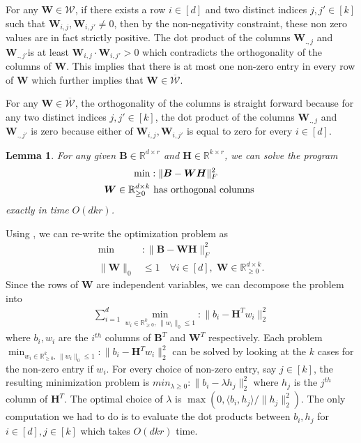 \documentclass[11pt]{article}
\makeatletter
\newcommand{\sumL}{\sum\limits}
\theoremstyle{plain}
\newtheorem{lemma}[theorem]{Lemma}
\theoremstyle{plain}
\theoremstyle{definition}
\theoremstyle{plain}
\theoremstyle{remark}
\newenvironment{proof}[1][\protect\proofname]{\par
	\normalfont\topsep6\p@\@plus6\p@\relax
	\trivlist
	\itemindent\parindent
	\item[\hskip\labelsep\scshape #1]\ignorespaces
}{\endtrivlist\@endpefalse
}
\providecommand{\proofname}{Proof}
\newcommand{\RR}{\mathbb{R}}
\newcommand{\cW}{\mathcal{W}}
\makeatother
\begin{document}
\begin{proof}
    For any $\bm{W}\in \cW$, if there exists a row $i\in [d]$ and two distinct indices $j,j' \in [k]$ such that $\bm{W}_{i,j},\bm{W}_{i,j'}\neq 0$, then by the non-negativity constraint, these non zero values are in fact strictly positive. The dot product of the columns $\bm{W}_{.,j}$ and $\bm{W}_{.,j'}$is at least $\bm{W}_{i,j}\cdot\bm{W}_{i,j'}>0$ which contradicts the orthogonality of the columns of $\bm{W}$. This implies that there is at most one non-zero entry in every row of $\bm{W}$ which further implies that $\bm{W}\in \overline{\cW}$. 

    For any $\bm{W}\in \overline{\cW}$, the orthogonality of the columns is straight forward because for any two distinct indices $j,j'\in [k]$, the dot product of the columns $\bm{W}_{.,j}$ and $\bm{W}_{.,j'}$ is zero because either of $\bm{W}_{i,j}, \bm{W}_{i,j'}$ is equal to zero for every $i\in [d]$.
\end{proof}

\begin{lemma}
\label{lem:NMF-regression}
    For any given $\bm{B}\in \RR^{d\times r}$ and $\bm{H}\in \RR^{k\times r}$, we can solve the program 
    \begin{align*}
        \min&: \|\bm{B}-\bm{W}\bm{H}\|_F^2 \\
   \bm{W}\in \RR^{d\times k}_{\geq 0} & \textnormal{ has orthogonal columns }
    \end{align*}
     exactly in time $O(dkr)$.
\end{lemma}
\begin{proof}
    Using , we can re-write the optimization problem as 
    \begin{align*}
         \min&: \|\bm{B}-\bm{W}\bm{H}\|_F^2 \\
   \|\bm{W}\|_{0} & \leq 1 \quad \forall i\in [d],\; \bm{W}\in \RR^{d\times k}_{\geq 0}. 
    \end{align*}
    Since the rows of $\bm{W}$ are independent variables, we can decompose the problem into 
    \begin{align*}
        \sumL_{i=1}^d \min_{ w_i\in \RR^{k}_{\geq 0},\,\|w_i\|_0\leq 1}: \|b_i-\bm{H}^T w_i\|_2^2
    \end{align*}
    where $b_i,w_i$ are the $i^{th}$ columns of $\bm{B}^T$ and $\bm{W}^T$ respectively. Each problem $\min_{ w_i\in \RR^{k}_{\geq 0},\,\|w_i\|_0\leq 1}: \|b_i-\bm{H}^T w_i\|_2^2$ can be solved by looking at the $k$ cases for the non-zero entry if $w_i$. For every choice of non-zero entry, say $j\in [k]$, the resulting minimization problem is $min_{\lambda \geq 0}: \|b_i - \lambda h_{j}\|_2^2$ where $h_j$ is the $j^{th}$ column of $\bm{H}^T$. The optimal choice of $\lambda$ is $\max(0,\langle b_i,h_j\rangle/\|h_j\|_2^2)$. The only computation we had to do is to evaluate the dot products between $b_i,h_j$ for $i\in [d], j\in [k]$ which takes $O(dkr)$ time. 
\end{proof}
\end{document}
